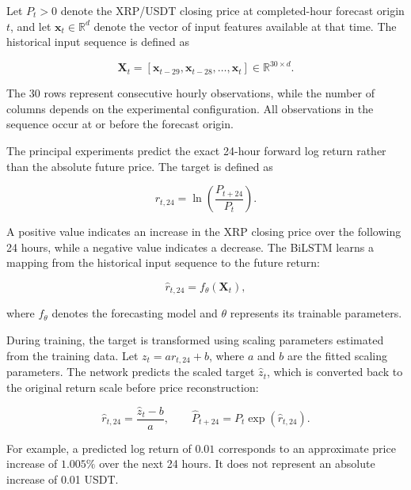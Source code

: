 Let $P_t>0$ denote the XRP/USDT closing price at completed-hour forecast origin $t$, and let $\mathbf{x}_t\in\mathbb{R}^{d}$ denote the vector of input features available at that time. The historical input sequence is defined as

\begin{equation}
\mathbf{X}_t
=
\left[
\mathbf{x}_{t-29},
\mathbf{x}_{t-28},
\ldots,
\mathbf{x}_t
\right]
\in\mathbb{R}^{30\times d}.
\label{eq:window}
\end{equation}

The 30 rows represent consecutive hourly observations, while the number of columns depends on the experimental configuration. All observations in the sequence occur at or before the forecast origin.

The principal experiments predict the exact 24-hour forward log return rather than the absolute future price. The target is defined as

\begin{equation}
r_{t,24}
=
\ln\left(\frac{P_{t+24}}{P_t}\right).
\label{eq:target_return}
\end{equation}

A positive value indicates an increase in the XRP closing price over the following 24 hours, while a negative value indicates a decrease. The BiLSTM learns a mapping from the historical input sequence to the future return:

\begin{equation}
\widehat{r}_{t,24}
=
f_{\theta}(\mathbf{X}_t),
\label{eq:return}
\end{equation}

where $f_{\theta}$ denotes the forecasting model and $\theta$ represents its trainable parameters.

During training, the target is transformed using scaling parameters estimated from the training data. Let $z_t=ar_{t,24}+b$, where $a$ and $b$ are the fitted scaling parameters. The network predicts the scaled target $\widehat{z}_t$, which is converted back to the original return scale before price reconstruction:

\begin{equation}
\widehat{r}_{t,24}
=
\frac{\widehat{z}_t-b}{a},
\qquad
\widehat{P}_{t+24}
=
P_t\exp(\widehat{r}_{t,24}).
\label{eq:inverse}
\end{equation}

For example, a predicted log return of $0.01$ corresponds to an approximate price increase of $1.005\%$ over the next 24 hours. It does not represent an absolute increase of 0.01 USDT.

